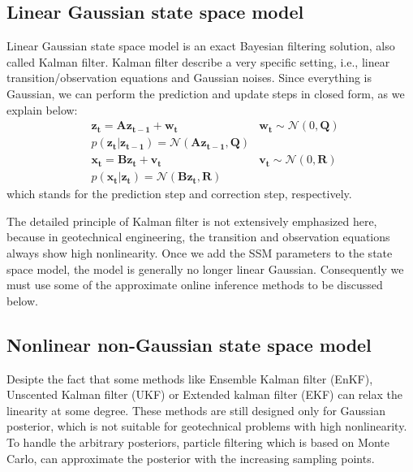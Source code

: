 \subsection{Linear Gaussian state space model}

Linear Gaussian state space model is an exact Bayesian filtering solution, also called Kalman filter. Kalman filter describe a very specific setting, i.e., linear transition/observation equations and Gaussian noises. Since everything is Gaussian, we can perform the prediction and update steps in closed form,
 as we explain below:
\setlength\abovedisplayskip{2pt}
\setlength\belowdisplayskip{2pt}
\begin{equation}
\begin{aligned}
   & \boldsymbol{{z}_{t}}  =\boldsymbol{A} \boldsymbol{{z}_{t-1}}+\boldsymbol{w_{t}}  
  \ \ &\boldsymbol{w_{t}}   \sim \mathcal{N}\left(0, \boldsymbol{Q} \right) \\    
    &p(\boldsymbol{{z}_{t}}|\boldsymbol{{z}_{t-1}}) = \mathcal{N}(\boldsymbol{A} \boldsymbol{{z}_{t-1}},\boldsymbol{Q})    
    \\
     &\boldsymbol{{x}_{t}}=\boldsymbol{B} \boldsymbol{{z}_{t}}+\boldsymbol{v_{t}}  \ \ &\boldsymbol{v_{t}} \sim \mathcal{N}\left(0, \boldsymbol{R} \right)\\
     &p(\boldsymbol{{x}_{t}}|\boldsymbol{{z}_{t}}) = \mathcal{N}(\boldsymbol{B} \boldsymbol{{z}_{t}},\boldsymbol{R})   
\end{aligned}
\end{equation}
which stands for the prediction step and correction step, respectively.

The detailed principle of Kalman filter is not extensively emphasized here, because in geotechnical engineering, the transition and observation equations always show high nonlinearity. Once we add the SSM parameters to the state space model, the model is generally no longer linear Gaussian. Consequently
we must use some of the approximate online inference methods to be discussed below.

\subsection{Nonlinear non-Gaussian state space model}

Desipte the fact that some methods like Ensemble Kalman filter (EnKF), Unscented Kalman filter (UKF) or Extended kalman filter (EKF) can relax the linearity at some degree. These methods are still designed only for Gaussian posterior, which is not suitable for geotechnical problems with high nonlinearity. To handle the arbitrary posteriors, particle filtering which is based on Monte Carlo, can approximate the posterior with the increasing sampling points.



